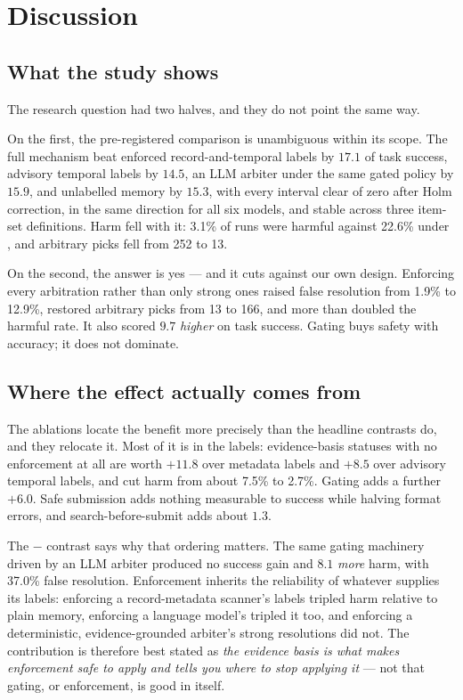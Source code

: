 \section{Discussion}
\label{sec:discussion}

\subsection{What the study shows}

The research question had two halves, and they do not point the same way.

On the first, the pre-registered comparison is unambiguous within its scope. The full mechanism beat enforced
record-and-temporal labels by $17.1$\pp{} of task success, advisory temporal labels by $14.5$\pp, an LLM arbiter
under the same gated policy by $15.9$\pp, and unlabelled memory by $15.3$\pp, with every interval clear of zero
after Holm correction, in the same direction for all six models, and stable across three item-set definitions.
Harm fell with it: 3.1\% of  runs were harmful against 22.6\% under , and arbitrary picks fell
from 252 to 13.

On the second, the answer is yes --- and it cuts against our own design. Enforcing every arbitration rather than
only strong ones raised false resolution from 1.9\% to 12.9\%, restored arbitrary picks from 13 to 166, and more
than doubled the harmful rate. It also scored $9.7$\pp{} \emph{higher} on task success. Gating buys safety with
accuracy; it does not dominate.

\subsection{Where the effect actually comes from}

The ablations locate the benefit more precisely than the headline contrasts do, and they relocate it. Most of it
is in the labels: evidence-basis statuses with no enforcement at all are worth $+11.8$\pp{} over metadata labels
and $+8.5$\pp{} over advisory temporal labels, and cut harm from about 7.5\% to 2.7\%. Gating adds a further
$+6.0$\pp. Safe submission adds nothing measurable to success while halving format errors, and
search-before-submit adds about $1.3$\pp.

The  $-$  contrast says why that ordering matters. The same gating machinery driven by an LLM
arbiter produced no success gain and $8.1$\pp{} \emph{more} harm, with 37.0\% false resolution. Enforcement
inherits the reliability of whatever supplies its labels: enforcing a record-metadata scanner's labels tripled harm
relative to plain memory, enforcing a language model's tripled it too, and enforcing a deterministic,
evidence-grounded arbiter's strong resolutions did not. The contribution is therefore best stated as \emph{the
evidence basis is what makes enforcement safe to apply and tells you where to stop applying it} --- not that
gating, or enforcement, is good in itself.

